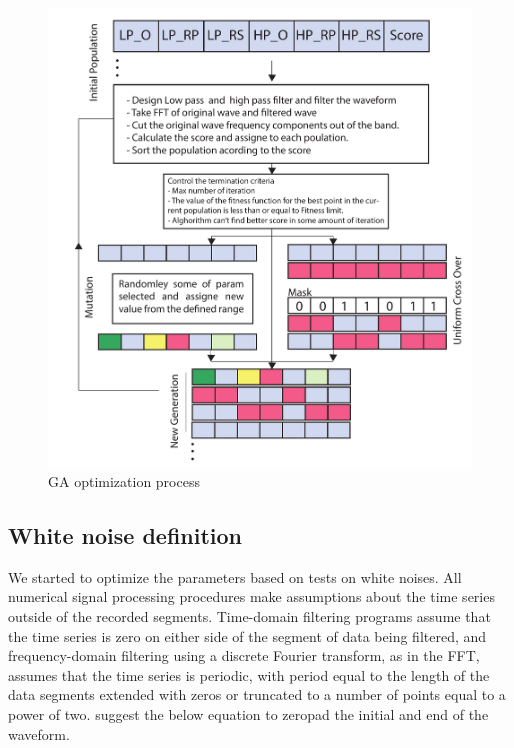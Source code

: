 \documentclass{article}
\begin{document}
\begin{figure} [H]
\begin{center}  
\includegraphics[scale=0.6]{figures/pdf/figure7.pdf} 
\caption{GA optimization process}
\end{center}   
\end{figure}



\subsection{White noise definition}
We started to optimize the parameters based on tests on white noises. All numerical signal processing procedures make assumptions about the time series outside of the recorded segments. Time-domain filtering programs assume that the time series is zero on either side of the segment of data being filtered, and frequency-domain filtering using a discrete Fourier transform, as in the FFT, assumes that the time series is periodic, with period equal to the length of the data segments extended with zeros or truncated to a number of points equal to a power of two. 
\citet{Converse-1992} suggest the below equation to zeropad the initial and end of the waveform. 
\end{document}
